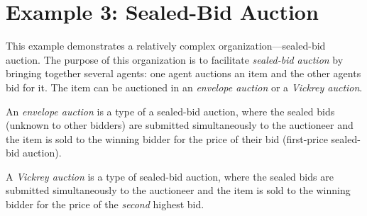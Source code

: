 
\section{Example 3: Sealed-Bid Auction}

This example demonstrates a relatively complex organization---sealed-bid auction.
The purpose of this organization is to facilitate \textit{sealed-bid auction} by bringing together several agents: one agent auctions an item and the other agents bid for it.
The item can be auctioned in an \textit{envelope auction} or a \textit{Vickrey auction}.

An \textit{envelope auction} is a type of a sealed-bid auction, where the sealed bids (unknown to other bidders) are submitted simultaneously to the auctioneer and the item is sold to the winning bidder for the price of their bid (first-price sealed-bid auction).

A \textit{Vickrey auction} is a type of sealed-bid auction, where the sealed bids are submitted simultaneously to the auctioneer and the item is sold to the winning bidder for the price of the \textit{second} highest bid.


